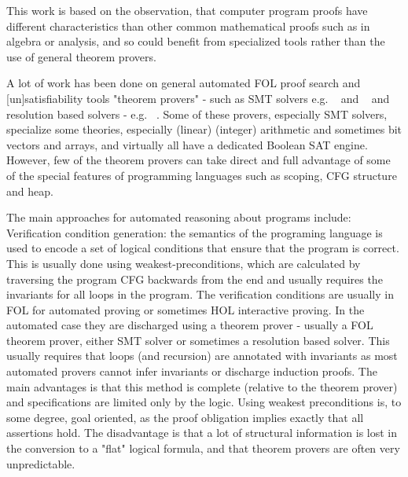 This work is based on the observation, that computer program proofs have different characteristics than other common mathematical proofs such as in algebra or analysis, and so could benefit from specialized tools rather than the use of general theorem provers.

A lot of work has been done on general automated FOL proof search and [un]satisfiability tools "theorem provers" - such as SMT solvers e.g. ~\cite{DBLP:conf/tacas/MouraB08} and ~\cite{DBLP:conf/cav/BarrettCDHJKRT11} and resolution based solvers - e.g. ~\cite{DBLP:conf/cade/RiazanovV99}.
Some of these provers, especially SMT solvers, specialize some theories, especially (linear) (integer) arithmetic and sometimes bit vectors and arrays, and virtually all have a dedicated Boolean SAT engine.
However, few of the theorem provers can take direct and full advantage of some of the special features of programming languages such as scoping, CFG structure and heap.

The main approaches for automated reasoning about programs include:\\
Verification condition generation: the semantics of the programing language is used to encode a set of logical conditions that ensure that the program is correct.
This is usually done using weakest-preconditions, which are calculated by traversing the program CFG backwards from the end and usually requires the invariants for all loops in the program.
The verification conditions are usually in FOL for automated proving or sometimes HOL interactive proving.
In the automated case they are discharged using a theorem prover - usually a FOL theorem prover, either SMT solver or sometimes a resolution based solver.
This usually requires that loops (and recursion) are annotated with invariants as most automated provers cannot infer invariants or discharge induction proofs.
The main advantages is that this method is complete (relative to the theorem prover) and specifications are limited only by the logic.
Using weakest preconditions is, to some degree, goal oriented, as the proof obligation implies exactly that all assertions hold.
The disadvantage is that a lot of structural information is lost in the conversion to a "flat" logical formula, and that theorem provers are often very unpredictable.


